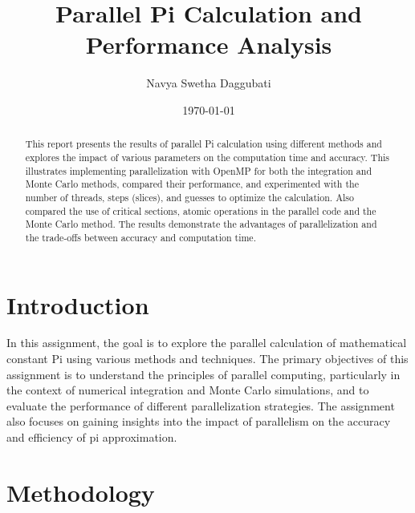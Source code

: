 \documentclass[11pt, twocolumn]{article}
\title{Parallel Pi Calculation and Performance Analysis}
\author{Navya Swetha Daggubati}
\date{\today}
\begin{document}
\maketitle

\begin{abstract}
This report presents the results of parallel Pi calculation using different methods and explores the impact of various parameters on the computation time and accuracy. This illustrates implementing parallelization with OpenMP for both the integration and Monte Carlo methods, compared their performance, and experimented with the number of threads, steps (slices), and guesses to optimize the calculation. Also compared the use of critical sections, atomic operations in the parallel code and the Monte Carlo method. The results demonstrate the advantages of parallelization and the trade-offs between accuracy and computation time.
\end{abstract}

\section{Introduction}
In this assignment, the goal is to explore the parallel calculation of mathematical constant Pi using various methods and techniques. The primary objectives of this assignment is to understand the principles of parallel computing, particularly in the context of numerical integration and Monte Carlo simulations, and to evaluate the performance of different parallelization strategies. The assignment also focuses on gaining insights into the impact of parallelism on the accuracy and efficiency of pi approximation.
\section{Methodology}
\end{document}
